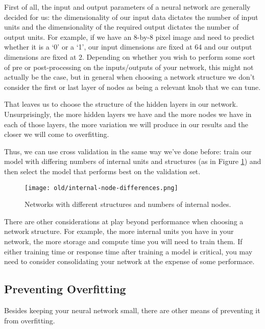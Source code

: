 First of all, the input and output parameters of a neural network are generally decided for us: the dimensionality of our input data dictates the number of input units and the dimensionality of the required output dictates the number of output units. For example, if we have an 8-by-8 pixel image and need to predict whether it is a `0' or a `1', our input dimensions are fixed at 64 and our output dimensions are fixed at 2. Depending on whether you wish to perform some sort of pre or post-processing on the inputs/outputs of your network, this might not actually be the case, but in general when choosing a network structure we don't consider the first or last layer of nodes as being a relevant knob that we can tune.

That leaves us to choose the structure of the hidden layers in our network. Unsurprisingly, the more hidden layers we have and the more nodes we have in each of those layers, the more variation we will produce in our results and the closer we will come to overfitting.

Thus, we can use cross validation in the same way we've done before: train our model with differing numbers of internal units and structures (as in Figure \ref{fig:internal-node-differences}) and then select the model that performs best on the validation set.

\begin{figure}
    \centering
    \texttt{[image: old/internal-node-differences.png]}
    \caption{Networks with different structures and numbers of internal nodes.}
    \label{fig:internal-node-differences}
\end{figure}

\begin{warning}
    There are other considerations at play beyond performance when choosing a network structure. For example, the more internal units you have in your network, the more storage and compute time you will need to train them. If either training time or response time after training a model is critical, you may need to consider consolidating your network at the expense of some performace.
\end{warning}

\subsection{Preventing Overfitting}
Besides keeping your neural network small, there are other means of preventing it from overfitting.

